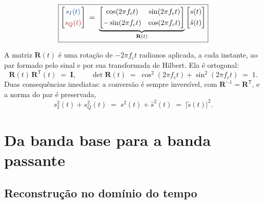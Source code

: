 \documentclass[11pt,a4paper]{article}
\begin{document}
\begin{quadro}
\[
  \boxed{
  \begin{bmatrix} \textcolor{azul}{s_I(t)} \\[0.35em] \textcolor{vermelho}{s_Q(t)} \end{bmatrix}
  \;=\;
  \underbrace{\begin{bmatrix}
     \cos(2\pi f_c t) & \sin(2\pi f_c t) \\[0.35em]
    -\sin(2\pi f_c t) & \cos(2\pi f_c t)
  \end{bmatrix}}_{\mathbf{R}(t)}
  \begin{bmatrix} s(t) \\[0.35em] \hat{s}(t) \end{bmatrix}}
\]
\end{quadro}

A matriz $\mathbf{R}(t)$ é uma rotação de $-2\pi f_c t$ radianos aplicada, a cada instante, ao par formado pelo sinal e por sua transformada de Hilbert. Ela é ortogonal:
\begin{equation}
  \mathbf{R}(t)\,\mathbf{R}^{\mathsf{T}}(t) \;=\; \mathbf{I},
  \qquad
  \det \mathbf{R}(t) \;=\; \cos^{2}(2\pi f_c t) + \sin^{2}(2\pi f_c t) \;=\; 1 .
  \label{eq:R_ortogonal}
\end{equation}
Duas consequências imediatas: a conversão é sempre inversível, com $\mathbf{R}^{-1} = \mathbf{R}^{\mathsf{T}}$, e a norma do par é preservada,
\begin{equation}
  s_I^{2}(t) + s_Q^{2}(t) \;=\; s^{2}(t) + \hat{s}^{2}(t) \;=\; \bigl|\tilde{s}(t)\bigr|^{2} .
  \label{eq:norma_preservada}
\end{equation}

\section{Da banda base para a banda passante}

\subsection{Reconstrução no domínio do tempo}
\end{document}
